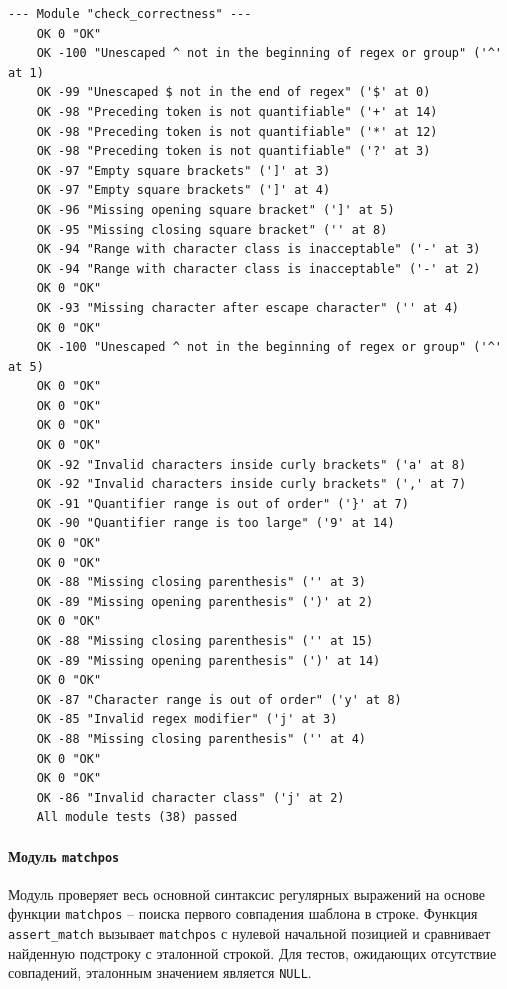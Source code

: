\begin{lstlisting}[caption={Результат выполнения модуля check\_correctness}, label={fig:test_correctness}]
	--- Module "check_correctness" ---
	OK 0 "OK"
	OK -100 "Unescaped ^ not in the beginning of regex or group" ('^' at 1)
	OK -99 "Unescaped $ not in the end of regex" ('$' at 0)
	OK -98 "Preceding token is not quantifiable" ('+' at 14)
	OK -98 "Preceding token is not quantifiable" ('*' at 12)
	OK -98 "Preceding token is not quantifiable" ('?' at 3)
	OK -97 "Empty square brackets" (']' at 3)
	OK -97 "Empty square brackets" (']' at 4)
	OK -96 "Missing opening square bracket" (']' at 5)
	OK -95 "Missing closing square bracket" ('' at 8)
	OK -94 "Range with character class is inacceptable" ('-' at 3)
	OK -94 "Range with character class is inacceptable" ('-' at 2)
	OK 0 "OK"
	OK -93 "Missing character after escape character" ('' at 4)
	OK 0 "OK"
	OK -100 "Unescaped ^ not in the beginning of regex or group" ('^' at 5)
	OK 0 "OK"
	OK 0 "OK"
	OK 0 "OK"
	OK 0 "OK"
	OK -92 "Invalid characters inside curly brackets" ('a' at 8)
	OK -92 "Invalid characters inside curly brackets" (',' at 7)
	OK -91 "Quantifier range is out of order" ('}' at 7)
	OK -90 "Quantifier range is too large" ('9' at 14)
	OK 0 "OK"
	OK 0 "OK"
	OK -88 "Missing closing parenthesis" ('' at 3)
	OK -89 "Missing opening parenthesis" (')' at 2)
	OK 0 "OK"
	OK -88 "Missing closing parenthesis" ('' at 15)
	OK -89 "Missing opening parenthesis" (')' at 14)
	OK 0 "OK"
	OK -87 "Character range is out of order" ('y' at 8)
	OK -85 "Invalid regex modifier" ('j' at 3)
	OK -88 "Missing closing parenthesis" ('' at 4)
	OK 0 "OK"
	OK 0 "OK"
	OK -86 "Invalid character class" ('j' at 2)
	All module tests (38) passed
\end{lstlisting}

\paragraph{Модуль \texttt{matchpos}}

Модуль проверяет весь основной синтаксис регулярных выражений на основе функции \verb`matchpos` -- поиска первого совпадения шаблона в строке. Функция \verb`assert_match` вызывает \verb`matchpos` с нулевой начальной позицией и сравнивает найденную подстроку с эталонной строкой. Для тестов, ожидающих отсутствие совпадений, эталонным значением является \verb`NULL`.

